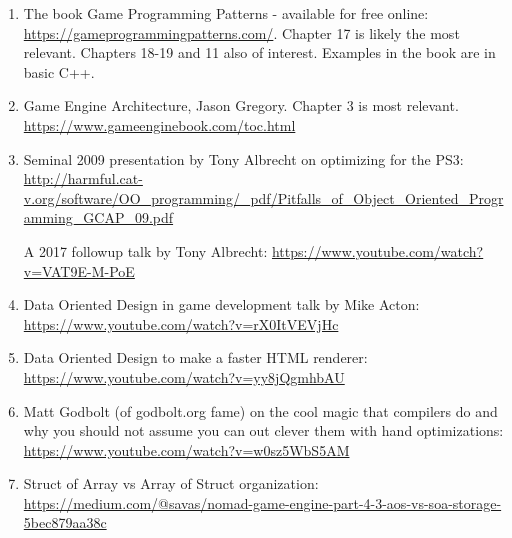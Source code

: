 \documentclass[12pt,letterpaper]{article}
\begin{document}
	\begin{enumerate}

		\item The book Game Programming Patterns - available for free online: \url{https://gameprogrammingpatterns.com/}. Chapter 17 is likely the most relevant. Chapters 18-19 and 11 also of interest. Examples in the book are in basic C++.
	
		\item Game Engine Architecture, Jason Gregory. Chapter 3 is most relevant. \url{https://www.gameenginebook.com/toc.html}

		\item Seminal 2009 presentation by Tony Albrecht on optimizing for the PS3: 
		\url{http://harmful.cat-v.org/software/OO_programming/_pdf/Pitfalls_of_Object_Oriented_Programming_GCAP_09.pdf}

		A 2017 followup talk by Tony Albrecht:
		\url{https://www.youtube.com/watch?v=VAT9E-M-PoE}


		\item Data Oriented Design in game development talk by Mike Acton: \url{https://www.youtube.com/watch?v=rX0ItVEVjHc}

		\item Data Oriented Design to make a faster HTML renderer: \url{https://www.youtube.com/watch?v=yy8jQgmhbAU}

		\item Matt Godbolt (of godbolt.org fame) on the cool magic that compilers do and why you should not assume you can out clever them with hand optimizations:
		\url{https://www.youtube.com/watch?v=w0sz5WbS5AM}

		\item Struct of Array vs Array of Struct organization: \url{https://medium.com/@savas/nomad-game-engine-part-4-3-aos-vs-soa-storage-5bec879aa38c} 
		
	\end{enumerate}
\end{document}
